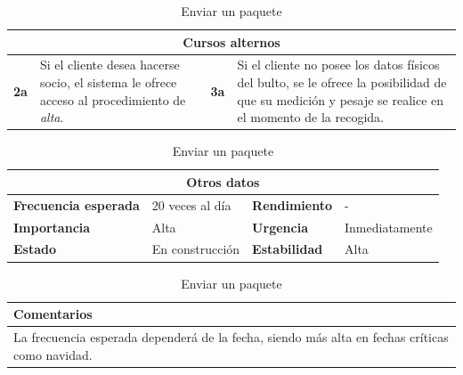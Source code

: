 \documentclass[12pt,spanish]{article}
\begin{document}
\begin{table}[H]
\vspace{1cm}

\begin{tabular}{|m{10pt}|m{7.15cm}|m{10pt}|m{7.15cm}|}
\hline
\multicolumn{4}{|c|}{\textbf{Cursos alternos}} \\
\hline
\textbf{2a} & Si el cliente desea hacerse socio, el sistema le ofrece acceso al procedimiento de \emph{alta}. & \textbf{3a} & Si el cliente no posee los datos físicos del bulto, se le ofrece la posibilidad de que su medición y pesaje se realice en el momento de la recogida.  \\
\hline
\end{tabular}

\vspace{1cm}

\begin{tabular}{|m{3.72cm}|m{3.72cm}|m{3.72cm}|m{3.72cm}|}
\hline
\multicolumn{4}{|c|}{\textbf{Otros datos}} \\
\hline
\textbf{Frecuencia esperada} & 20 veces al día & \textbf{Rendimiento} & - \\
\hline
\textbf{Importancia} & Alta & \textbf{Urgencia} & Inmediatamente \\
\hline
\textbf{Estado} & En construcción & \textbf{Estabilidad} & Alta \\
\hline
\end{tabular}

\vspace{1cm}

\begin{tabular}{|m{16.2cm}|}
\hline
\textbf{Comentarios} \\
\hline
La frecuencia esperada dependerá de la fecha, siendo más alta en fechas críticas como navidad. \\
\hline
\end{tabular}

\caption{Enviar un paquete}

\end{table}

\end{document}
